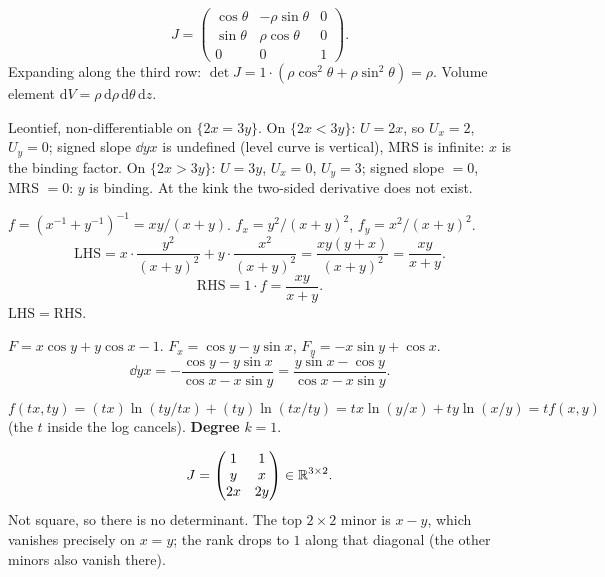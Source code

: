 \begin{solutions}
  \item
        \[
          J=\begin{pmatrix}
            \cos\theta & -\rho\sin\theta & 0\\
            \sin\theta & \rho\cos\theta & 0\\
            0 & 0 & 1
          \end{pmatrix} .
        \]
        Expanding along the third row:
        $\det J = 1\cdot(\rho\cos^{2}\theta+\rho\sin^{2}\theta)=\rho$.
        Volume element $\mathrm{d}V=\rho\,\mathrm{d}\rho\,\mathrm{d}\theta\,\mathrm{d}z$.

  \item Leontief, non-differentiable on $\{2x=3y\}$. On $\{2x<3y\}$:
        $U=2x$, so $U_{x}=2$, $U_{y}=0$; signed slope $\dd{y}{x}$ is
        undefined (level curve is vertical), MRS is infinite: $x$ is
        the binding factor. On $\{2x>3y\}$: $U=3y$, $U_{x}=0$, $U_{y}=3$;
        signed slope $=0$, MRS $=0$: $y$ is binding. At the kink the
        two-sided derivative does not exist.

  \item $f=(x^{-1}+y^{-1})^{-1}=xy/(x+y)$. $f_{x}=y^{2}/(x+y)^{2}$,
        $f_{y}=x^{2}/(x+y)^{2}$.
        \[
          \mathrm{LHS}=x\cdot\frac{y^{2}}{(x+y)^{2}}
            +y\cdot\frac{x^{2}}{(x+y)^{2}}
            =\frac{xy(y+x)}{(x+y)^{2}}=\frac{xy}{x+y} .
        \]
        \[
          \mathrm{RHS}=1\cdot f=\frac{xy}{x+y} .
        \]
        $\mathrm{LHS}=\mathrm{RHS}$. \checkmark

  \item $F=x\cos y+y\cos x-1$. $F_{x}=\cos y-y\sin x$,
        $F_{y}=-x\sin y+\cos x$.
        \[
          \dd{y}{x} = -\frac{\cos y-y\sin x}{\cos x-x\sin y}
            = \frac{y\sin x-\cos y}{\cos x-x\sin y} .
        \]

  \item
        \[
          f(tx,ty)=(tx)\ln(ty/tx)+(ty)\ln(tx/ty)
            =tx\ln(y/x)+ty\ln(x/y)=t f(x,y)
        \]
        (the $t$ inside the log cancels). \textbf{Degree} $k=1$.

  \item
        \[
          J=\begin{pmatrix} 1 & 1\\ y & x\\ 2x & 2y\end{pmatrix}
            \in\mathbb{R}^{3\times 2} .
        \]
        Not square, so there is no determinant. The top $2\times 2$
        minor is $x-y$, which vanishes precisely on $x=y$; the rank
        drops to $1$ along that diagonal (the other minors also vanish
        there).


\end{solutions}

